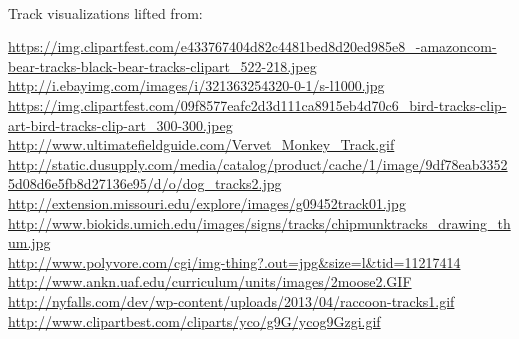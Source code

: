 \hfill \\
\vfill

\centerline{Track visualizations lifted from:}

{
\noindent
\tiny
\url{https://img.clipartfest.com/e433767404d82c4481bed8d20ed985e8_-amazoncom-bear-tracks-black-bear-tracks-clipart_522-218.jpeg} \\
\url{http://i.ebayimg.com/images/i/321363254320-0-1/s-l1000.jpg} \\
\url{https://img.clipartfest.com/09f8577eafc2d3d111ca8915eb4d70c6_bird-tracks-clip-art-bird-tracks-clip-art_300-300.jpeg} \\
\url{http://www.ultimatefieldguide.com/Vervet_Monkey_Track.gif} \\
\url{http://static.dusupply.com/media/catalog/product/cache/1/image/9df78eab33525d08d6e5fb8d27136e95/d/o/dog_tracks2.jpg} \\
\url{http://extension.missouri.edu/explore/images/g09452track01.jpg} \\
\url{http://www.biokids.umich.edu/images/signs/tracks/chipmunktracks_drawing_thum.jpg} \\
\url{http://www.polyvore.com/cgi/img-thing?.out=jpg&size=l&tid=11217414} \\
\url{http://www.ankn.uaf.edu/curriculum/units/images/2moose2.GIF} \\
\url{http://nyfalls.com/dev/wp-content/uploads/2013/04/raccoon-tracks1.gif} \\
\url{http://www.clipartbest.com/cliparts/yco/g9G/ycog9Gzgi.gif} \\
}
